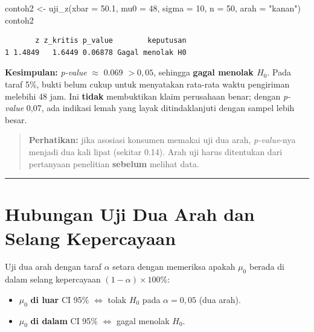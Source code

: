 \documentclass[
  indonesian,
  letterpaper,
]{book}
\newenvironment{Shaded}{\begin{snugshade}}{\end{snugshade}}
\newcommand{\AttributeTok}[1]{\textcolor[rgb]{0.40,0.45,0.13}{#1}}
\newcommand{\DecValTok}[1]{\textcolor[rgb]{0.68,0.00,0.00}{#1}}
\newcommand{\FloatTok}[1]{\textcolor[rgb]{0.68,0.00,0.00}{#1}}
\newcommand{\FunctionTok}[1]{\textcolor[rgb]{0.28,0.35,0.67}{#1}}
\newcommand{\NormalTok}[1]{\textcolor[rgb]{0.00,0.23,0.31}{#1}}
\newcommand{\OtherTok}[1]{\textcolor[rgb]{0.00,0.23,0.31}{#1}}
\newcommand{\StringTok}[1]{\textcolor[rgb]{0.13,0.47,0.30}{#1}}
\providecommand{\tightlist}{%
  \setlength{\itemsep}{0pt}\setlength{\parskip}{0pt}}
\begin{document}
\begin{Shaded}
\begin{Highlighting}[]
\NormalTok{contoh2 }\OtherTok{\textless{}{-}} \FunctionTok{uji\_z}\NormalTok{(}\AttributeTok{xbar =} \FloatTok{50.1}\NormalTok{, }\AttributeTok{mu0 =} \DecValTok{48}\NormalTok{, }\AttributeTok{sigma =} \DecValTok{10}\NormalTok{, }\AttributeTok{n =} \DecValTok{50}\NormalTok{, }\AttributeTok{arah =} \StringTok{"kanan"}\NormalTok{)}
\NormalTok{contoh2}
\end{Highlighting}
\end{Shaded}

\begin{verbatim}
       z z_kritis p_value        keputusan
1 1.4849   1.6449 0.06878 Gagal menolak H0
\end{verbatim}

\textbf{Kesimpulan:} \emph{p-value} \(\approx\) 0.069 \(> 0{,}05\),
sehingga \textbf{gagal menolak \(H_0\)}. Pada taraf 5\%, bukti belum
cukup untuk menyatakan rata-rata waktu pengiriman melebihi 48 jam. Ini
\textbf{tidak} membuktikan klaim perusahaan benar; dengan \emph{p-value}
0,07, ada indikasi lemah yang layak ditindaklanjuti dengan sampel lebih
besar.

\begin{quote}
\textbf{Perhatikan:} jika asosiasi konsumen memakai uji dua arah,
\emph{p-value}-nya menjadi dua kali lipat (sekitar 0.14). Arah uji harus
ditentukan dari pertanyaan penelitian \textbf{sebelum} melihat data.
\end{quote}

\begin{center}\rule{0.5\linewidth}{0.5pt}\end{center}


\chapter{Hubungan Uji Dua Arah dan Selang
Kepercayaan}\label{hubungan-uji-dua-arah-dan-selang-kepercayaan}

Uji dua arah dengan taraf \(\alpha\) setara dengan memeriksa apakah
\(\mu_0\) berada di dalam selang kepercayaan
\((1-\alpha) \times 100\%\):

\begin{itemize}
\tightlist
\item
  \(\mu_0\) \textbf{di luar} CI 95\% \(\iff\) tolak \(H_0\) pada
  \(\alpha = 0{,}05\) (dua arah).
\item
  \(\mu_0\) \textbf{di dalam} CI 95\% \(\iff\) gagal menolak \(H_0\).
\end{itemize}
\end{document}
